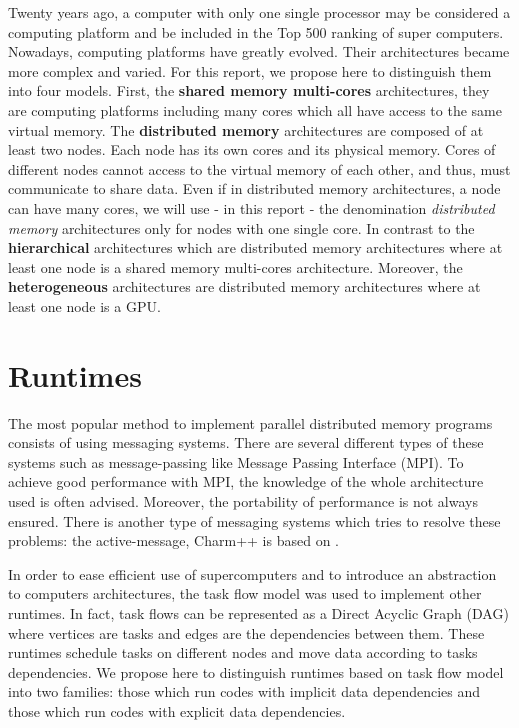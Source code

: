 Twenty years ago, a computer with only one single processor may be considered a computing platform and be included in the Top 500 ranking of super computers. Nowadays, computing platforms have greatly evolved. Their architectures became more complex and varied. For this report, we propose here to distinguish them into four models. First, the \textbf{shared memory multi-cores} architectures, they are computing platforms including many cores which all have access to the same virtual memory. The \textbf{distributed memory} architectures are composed of at least two nodes. Each node has its own cores and its physical memory. Cores of different nodes cannot access to the virtual memory of each other, and thus, must communicate to share data. Even if in distributed memory architectures, a node can have many cores,  we will use - in this report - the denomination \textit{distributed memory} architectures only for nodes with one single core. In contrast to the \textbf{hierarchical} architectures which are distributed memory architectures where at least one node is a shared memory multi-cores architecture. Moreover, the \textbf{heterogeneous} architectures are distributed memory architectures where at least one node is a GPU.

\section{Runtimes}
The most popular method to implement parallel distributed memory programs consists of using messaging systems. There are several different types of these systems such as message-passing like Message Passing Interface (MPI)\cite{Message94}. To achieve good performance with MPI, the knowledge of the whole architecture used is often advised. Moreover, the portability of performance is not always ensured. There is another type of messaging systems which tries to resolve these problems: the active-message, Charm++ is based on \cite{KaleLVandK1993b}.

In order to ease efficient use of supercomputers and to introduce an abstraction to computers architectures, the task flow model was used to implement other runtimes. In fact, task flows can be represented as a Direct Acyclic Graph (DAG) where vertices are tasks and edges are the dependencies between them. These runtimes schedule tasks on different nodes and move data according to tasks dependencies.
We propose here to distinguish runtimes based on task flow model into two families: those which run codes with implicit data dependencies and those which run codes with explicit data dependencies.

